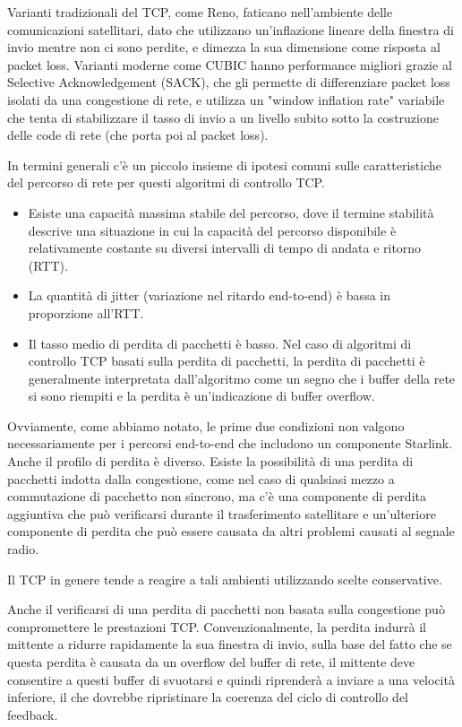 Varianti tradizionali del \ac{TCP}, come Reno, faticano nell'ambiente delle comunicazioni satellitari, dato che utilizzano un'inflazione lineare della finestra di invio mentre non ci sono perdite, e dimezza la sua dimensione come risposta al packet loss.
Varianti moderne come CUBIC hanno performance migliori grazie al Selective Acknowledgement (SACK), che gli permette di differenziare packet loss isolati da una congestione di rete, e utilizza un "window inflation rate" variabile che tenta di stabilizzare il tasso di invio a un livello subito sotto la costruzione delle code di rete (che porta poi al packet loss).

In termini generali c'è un piccolo insieme di ipotesi comuni sulle caratteristiche del percorso di rete per questi algoritmi di controllo TCP.
\begin{itemize}
  \item Esiste una capacità massima stabile del percorso, dove il termine stabilità descrive una situazione in cui la capacità del percorso disponibile è relativamente costante su diversi intervalli di tempo di andata e ritorno (RTT).
  \item La quantità di jitter (variazione nel ritardo end-to-end) è bassa in proporzione all'RTT.
  \item Il tasso medio di perdita di pacchetti è basso. Nel caso di algoritmi di controllo TCP basati sulla perdita di pacchetti, la perdita di pacchetti è generalmente interpretata dall'algoritmo come un segno che i buffer della rete si sono riempiti e la perdita è un'indicazione di buffer overflow.
\end{itemize}

Ovviamente, come abbiamo notato, le prime due condizioni non valgono necessariamente per i percorsi end-to-end che includono un componente Starlink.
Anche il profilo di perdita è diverso.
Esiste la possibilità di una perdita di pacchetti indotta dalla congestione, come nel caso di qualsiasi mezzo a commutazione di pacchetto non sincrono, ma c'è una componente di perdita aggiuntiva che può verificarsi durante il trasferimento satellitare e un'ulteriore componente di perdita che può essere causata da altri problemi causati al segnale radio.

Il TCP in genere tende a reagire a tali ambienti utilizzando scelte conservative.

Anche il verificarsi di una perdita di pacchetti non basata sulla congestione può compromettere le prestazioni TCP. Convenzionalmente, la perdita indurrà il mittente a ridurre rapidamente la sua finestra di invio, sulla base del fatto che se questa perdita è causata da un overflow del buffer di rete, il mittente deve consentire a questi buffer di svuotarsi e quindi riprenderà a inviare a una velocità inferiore, il che dovrebbe ripristinare la coerenza del ciclo di controllo del feedback.

